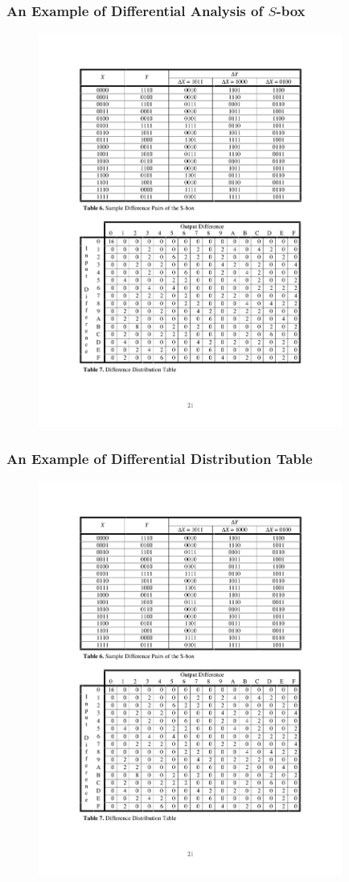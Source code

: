 \begin{frame}\frametitle{An Example of Differential Analysis of $S$-box}
\begin{figure}
\begin{center}
\includegraphics[width=100mm]{pic/difference-sbox} 
\end{center}
\end{figure}
\end{frame}
\begin{frame}\frametitle{An Example of Differential Distribution Table}
\begin{figure}
\begin{center}
\includegraphics[width=100mm]{pic/difference-table} 
\end{center}
\end{figure}
\end{frame}
